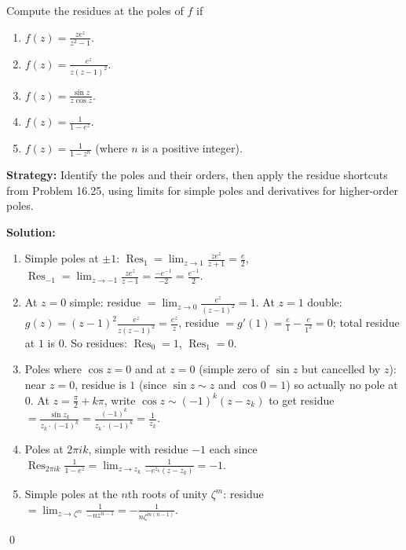\begin{problembox}
\begin{problemstatement}
Compute the residues at the poles of \( f \) if
\begin{enumerate}[label=(\alph*)]
\item \( f(z) = \frac{ze^z}{z^2 - 1} \).
\item \( f(z) = \frac{e^z}{z(z - 1)^2} \).
\item \( f(z) = \frac{\sin z}{z \cos z} \).
\item \( f(z) = \frac{1}{1 - e^z} \).
\item \( f(z) = \frac{1}{1 - z^n} \) (where \( n \) is a positive integer).
\end{enumerate}
\end{problemstatement}
\end{problembox}

\noindent\textbf{Strategy:} Identify the poles and their orders, then apply the residue shortcuts from Problem 16.25, using limits for simple poles and derivatives for higher-order poles.

\bigskip\noindent\textbf{Solution:}
\begin{enumerate}[label=(\alph*)]
\item Simple poles at $\pm1$: $\operatorname{Res}_{1}=\lim_{z\to1}\frac{ze^z}{z+1}=\tfrac{e}{2}$, $\operatorname{Res}_{-1}=\lim_{z\to-1}\frac{ze^z}{z-1}=\tfrac{-e^{-1}}{-2}=\tfrac{e^{-1}}{2}$.
\item At $z=0$ simple: residue $=\lim_{z\to0}\frac{e^z}{(z-1)^2}=1$. At $z=1$ double: $g(z)=(z-1)^2\frac{e^z}{z(z-1)^2}=\frac{e^z}{z}$, residue $=g'(1)=\frac{e}{1}-\frac{e}{1^2}=0$; total residue at $1$ is $0$. So residues: $\operatorname{Res}_0=1$, $\operatorname{Res}_1=0$.
\item Poles where $\cos z=0$ and at $z=0$ (simple zero of $\sin z$ but cancelled by $z$): near $z=0$, residue is $1$ (since $\sin z\sim z$ and $\cos 0=1$) so actually no pole at $0$. At $z=\frac{\pi}{2}+k\pi$, write $\cos z\sim (-1)^k(z-z_k)$ to get residue $=\frac{\sin z_k}{z_k\cdot(-1)^k}=\frac{(-1)^k}{z_k\cdot(-1)^k}=\frac{1}{z_k}$.
\item Poles at $2\pi i k$, simple with residue $-1$ each since $\operatorname{Res}_{2\pi i k}\frac{1}{1-e^z}=\lim_{z\to z_k}\frac{1}{-e^{z_k}(z-z_k)}=-1$.
\item Simple poles at the $n$th roots of unity $\zeta^m$: residue $=\lim_{z\to\zeta^m}\frac{1}{-n z^{n-1}}=-\frac{1}{n\zeta^{m(n-1)}}$.
\end{enumerate}\qed


